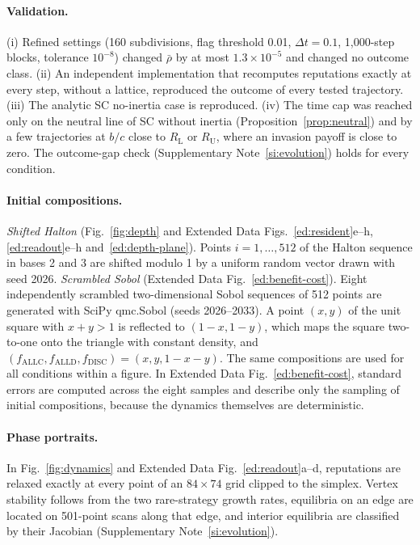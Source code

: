 \documentclass[10pt]{wlscirep}
\newcommand{\ALLC}{\mathrm{ALLC}}
\newcommand{\ALLD}{\mathrm{ALLD}}
\newcommand{\DISC}{\mathrm{DISC}}
\theoremstyle{plain}
\theoremstyle{remark}
\begin{document}
\paragraph{Validation.} (i) Refined settings (160 subdivisions, flag threshold 0.01, $\Delta t=0.1$, 1,000-step blocks, tolerance $10^{-8}$) changed $\bar\rho$ by at most $1.3\times10^{-5}$ and changed no outcome class. (ii) An independent implementation that recomputes reputations exactly at every step, without a lattice, reproduced the outcome of every tested trajectory. (iii) The analytic SC no-inertia case is reproduced. (iv) The time cap was reached only on the neutral line of SC without inertia (Proposition~\ref{prop:neutral}) and by a few trajectories at $b/c$ close to $R_{\mathrm L}$ or $R_{\mathrm U}$, where an invasion payoff is close to zero. The outcome-gap check (Supplementary Note~\ref{si:evolution}) holds for every condition.

\paragraph{Initial compositions.} \textit{Shifted Halton} (Fig.~\ref{fig:depth} and Extended Data Figs.~\ref{ed:resident}e--h, \ref{ed:readout}e--h and~\ref{ed:depth-plane}). Points $i=1,\ldots,512$ of the Halton sequence in bases 2 and 3 are shifted modulo 1 by a uniform random vector drawn with seed 2026. \textit{Scrambled Sobol} (Extended Data Fig.~\ref{ed:benefit-cost}). Eight independently scrambled two-dimensional Sobol sequences of 512 points are generated with SciPy qmc.Sobol (seeds 2026--2033). A point $(x,y)$ of the unit square with $x+y>1$ is reflected to $(1-x,1-y)$, which maps the square two-to-one onto the triangle with constant density, and $(f_{\ALLC},f_{\ALLD},f_{\DISC})=(x,y,1-x-y)$. The same compositions are used for all conditions within a figure. In Extended Data Fig.~\ref{ed:benefit-cost}, standard errors are computed across the eight samples and describe only the sampling of initial compositions, because the dynamics themselves are deterministic.

\paragraph{Phase portraits.} In Fig.~\ref{fig:dynamics} and Extended Data Fig.~\ref{ed:readout}a--d, reputations are relaxed exactly at every point of an $84\times74$ grid clipped to the simplex. Vertex stability follows from the two rare-strategy growth rates, equilibria on an edge are located on 501-point scans along that edge, and interior equilibria are classified by their Jacobian (Supplementary Note~\ref{si:evolution}).
\end{document}
